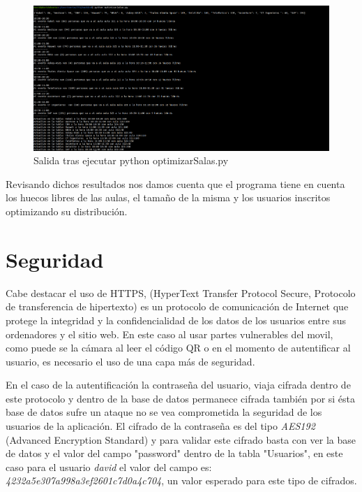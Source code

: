 \documentclass[a4paper, 12pt]{book}
\begin{document}
 \begin{figure}[H]
  	\centering
  	\includegraphics[width=16cm, keepaspectratio]{img/terminalOptimizar.png}
  	\caption{Salida tras ejecutar python optimizarSalas.py}\label{fig:terminalOptimizar}
	\end{figure}
 
Revisando dichos resultados nos damos cuenta que el programa tiene en cuenta los huecos libres de las aulas, el tamaño de la misma y los usuarios inscritos optimizando su distribución.


\section{Seguridad}
Cabe destacar el uso de HTTPS, (HyperText Transfer Protocol Secure, Protocolo de transferencia de hipertexto) es un protocolo de comunicación de Internet que protege la integridad y la confidencialidad de los datos de los usuarios entre sus ordenadores y el sitio web. En este caso al usar partes vulnerables del movil, como puede se la cámara al leer el código QR o en el momento de autentificar al usuario, es necesario el uso de una capa más de seguridad.
 
 
En el caso de la autentificación la contraseña del usuario, viaja cifrada dentro de este protocolo y dentro de la base de datos permanece cifrada también por si ésta base de datos sufre un ataque no se vea comprometida la seguridad de los usuarios de la aplicación.
El cifrado de la contraseña es del tipo \textit{AES192} (Advanced Encryption Standard) y para validar este cifrado basta con ver la base de datos y el valor del campo "password" dentro de la tabla "Usuarios", en este caso para el usuario \textit{david} el valor del campo es: \textit{4232a5e307a998a3ef2601c7d0a4c704}, un valor esperado para este tipo de cifrados.



\end{document}

